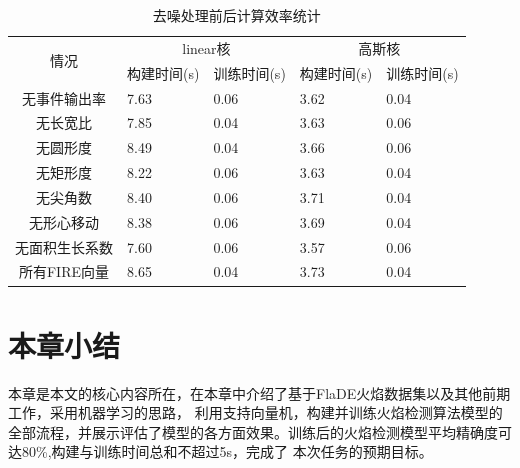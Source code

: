\begin{table}[ht]
    \centering
    \caption{去噪处理前后计算效率统计}
    \begin{tabularx}{\textwidth}{c|X|X|X|X}
    \toprule
    \multicolumn{1}{c|}{\multirow{2}{*}{情况}} & \multicolumn{2}{c|}{linear核} & \multicolumn{2}{c}{高斯核} \\ \cmidrule(l){2-5} 
    \multicolumn{1}{c|}{}  & 构建时间(s)     & 训练时间(s)    & 构建时间(s)     & 训练时间(s)  \\
    \midrule
    无事件输出率      &7.63       &0.06       &3.62       &0.04\\
    无长宽比         &7.85       &0.04       &3.63       &0.06\\
    无圆形度         &8.49       &0.04       &3.66       &0.06\\
    无矩形度         &8.22       &0.06       &3.63       &0.04\\
    无尖角数         &8.40       &0.06       &3.71       &0.04\\
    无形心移动       &8.38       &0.06       &3.69       &0.04\\
    无面积生长系数    &7.60       &0.06       &3.57       &0.06\\
    所有FIRE向量     &8.65       &0.04       &3.73       &0.04\\
    \bottomrule
    \end{tabularx}
    \label{denoise_proficiency}
\end{table}

\section{本章小结}
本章是本文的核心内容所在，在本章中介绍了基于FlaDE火焰数据集以及其他前期工作，采用机器学习的思路，
利用支持向量机，构建并训练火焰检测算法模型的全部流程，并展示评估了模型的各方面效果。训练后的火焰检测模型平均精确度可达80\%,构建与训练时间总和不超过5s，完成了
本次任务的预期目标。